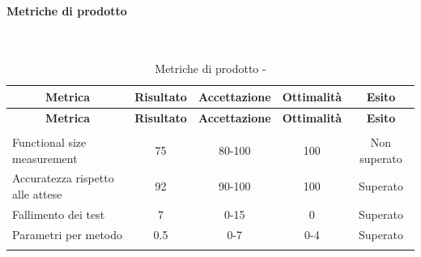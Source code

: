 \paragraph{Metriche di prodotto}\mbox{}\\
\begin{longtable}{|m{5cm}|c|c|c|c|}
	\hline \multicolumn{1}{|c|}{\textbf{Metrica}} & \multicolumn{1}{c|}{\textbf{Risultato}} & \multicolumn{1}{c|}{\textbf{Accettazione}} & \multicolumn{1}{c|}{\textbf{Ottimalità}} & \multicolumn{1}{c|}{\textbf{Esito}}\\
	\hline 
	\endfirsthead
	
	\hline \multicolumn{1}{|c|}{\textbf{Metrica}} & \multicolumn{1}{c|}{\textbf{Risultato}} & \multicolumn{1}{c|}{\textbf{Accettazione}} & \multicolumn{1}{c|}{\textbf{Ottimalità}} & \multicolumn{1}{c|}{\textbf{Esito}}\\
	\hline 
	\endhead
	
	\hline \multicolumn{5}{|r|}{\ToBeContinued} \\ 
	\hline
	\endfoot
	
	\endlastfoot
	
	\hline Functional size measurement & 75 & 80-100 & 100 & Non superato \\
	\hline Accuratezza rispetto alle attese & 92 & 90-100 & 100 & Superato \\
	\hline Fallimento dei test & 7 & 0-15 & 0 & Superato \\
	\hline Parametri per metodo & 0.5 & 0-7 & 0-4 & Superato \\
	\hline
	\caption{Metriche di prodotto - \RA{}}
\end{longtable}